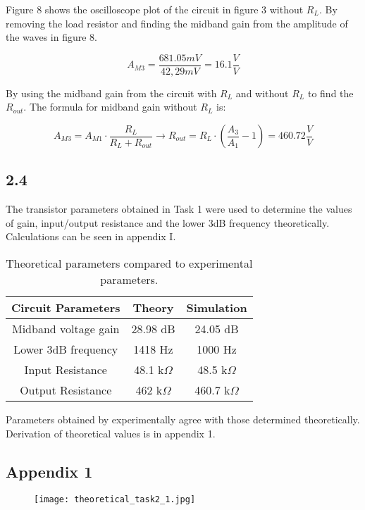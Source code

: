 	Figure 8 shows the oscilloscope plot of the circuit in figure 3 without $R_{L}$. By removing the load resistor and finding the midband gain from the amplitude of the waves in figure 8.


	$$ A_{M3} = \frac{681.05 mV}{42,29 mV} = 16.1 \frac{V}{V} $$

	By using the midband gain from the circuit with $R_{L}$ and without $R_{L}$ to find the $R_{out}$. The formula for midband gain without $R_{L}$ is:


	$$ A_{M3} = A_{M1} \cdot \frac{R_{L}}{R_{L} + R_{out}} \rightarrow R_{out} = R_{L} \cdot (\frac{A_{3}}{A_{1}}-1) = 460.72 \frac{V}{V}$$

\pagebreak




\subsection*{2.4}

The transistor parameters obtained in Task 1 were used to determine the values of gain, input/output resistance and the lower 3dB frequency theoretically. Calculations can be seen in appendix I.\\

\begin{table}[htbp]
    \centering
        \begin{tabular}{ c | c | c }
        \hline
        Circuit Parameters     &   Theory                  & Simulation \\
        \hline
        Midband voltage gain    &   28.98 dB			    &   24.05 dB\\
        Lower 3dB frequency     &   1418 Hz                &   1000 Hz\\
        Input Resistance        &   48.1 k$\Omega$           &   48.5 k$\Omega$\\
        Output Resistance       &   462 k$\Omega$            &   460.7 k$\Omega$\\
        \end{tabular}%
    \caption{Theoretical parameters compared to experimental parameters.}
    \label{tab:addlabel}%
\end{table}%

Parameters obtained by experimentally agree with those determined theoretically. Derivation of theoretical values is in appendix 1.


\pagebreak
\subsection*{Appendix 1}
\begin{figure}[h!]
\texttt{[image: theoretical\_task2\_1.jpg]}
\end{figure}
